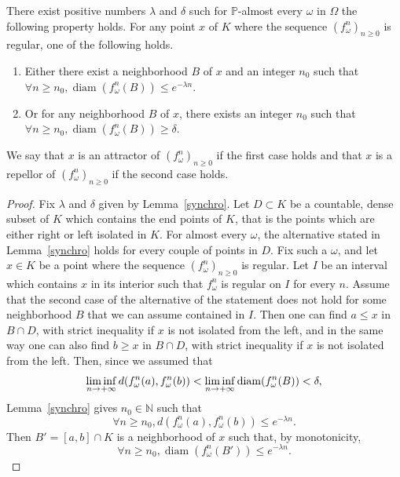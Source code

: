 \documentclass[AHL,Unicode,longabstracts,published]{cedram}
\DeclareMathOperator{\diam}{diam}
\newcommand{\bbP}{\mathbb{P}}
\newcommand{\N}{\mathbb{N}}
\newcounter{setofcase}
\newcounter{case}[setofcase]
\renewcommand*{\to}{\mathchoice{\longrightarrow}{\rightarrow}{\rightarrow}{\rightarrow}}
\let\originalleft\left
\let\originalright\right
\renewcommand{\left}{\mathopen{}\mathclose\bgroup\originalleft}
\renewcommand{\right}{\aftergroup\egroup\originalright}
\let\oldforall\forall
\renewcommand*{\forall}{\mathrel{\oldforall}}
\begin{document}
\begin{lemm}
There exist positive numbers $\lambda$ and $\delta$ such for $\bbP$-almost every $\omega$ in $\Omega$ the following property holds. For any point $x$ of $K$ where the sequence $(f_\omega^n)_{n\geq 0}$ is regular, one of the following holds.
\begin{enumerate}
\item\label{lemm5.5.1} Either there exist a neighborhood $B$ of $x$ and an integer $n_0$ such that $\forall n \geq n_0, \diam(f_\omega^n(B)) \leq e^{-\lambda n}.$
\item\label{lemm5.5.2} Or for any neighborhood $B$ of $x$, there exists an integer $n_0$ such that $\forall n\geq n_0, \diam(f_\omega^n(B))\geq \delta$.
\end{enumerate}
We say that $x$ is an attractor of $(f_\omega^n)_{n\geq 0}$ if the first case holds and that $x$ is a repellor of $(f_\omega^n)_{n\geq 0}$ if the second case holds.
\end{lemm}

\begin{proof}
Fix $\lambda$ and $\delta$ given by Lemma~\ref{synchro}. Let $D\subset K$ be a countable, dense subset of $K$ which contains the end points of $K$, that is the points which are either right or left isolated in $K$. For almost every $\omega$, the alternative stated in Lemma~\ref{synchro} holds for every couple of points in $D$. Fix such a $\omega$, and let $x\in K$ be a point where the sequence $(f^n_\omega)_{n \geq 0}$ is regular. Let $I$ be an interval which contains $x$ in its interior such that $f_\omega^n$ is regular on $I$ for every $n$. Assume that the second case of the alternative of the statement does not hold for some neighborhood $B$ that we can assume contained in $I$. Then one can find $a\leq x$ in $B\cap D$, with strict inequality if $x$ is not isolated from the left, and in the same way one can also find $b\geq x$ in $B\cap D$, with strict inequality if $x$ is not isolated from the left. Then, since we assumed that
\[
\liminf_{n\to +\infty} d\left(f_\omega^n(a),f_\omega^n(b)\right) <\liminf_{n\to +\infty} \diam(f_\omega^n(B))<\delta,
\]
Lemma~\ref{synchro} gives $n_0\in\N$ such that
\[
\forall n\geq n_0, d(f_\omega^n(a),f_\omega^n(b))\leq e^{-\lambda n}.
\]
Then $B'=[a,b]\cap K$ is a neighborhood of $x$ such that, by monotonicity,
\[
\forall n\geq n_0, \diam(f_\omega^n(B'))\leq e^{-\lambda n}.
\]
\end{proof}
\end{document}
